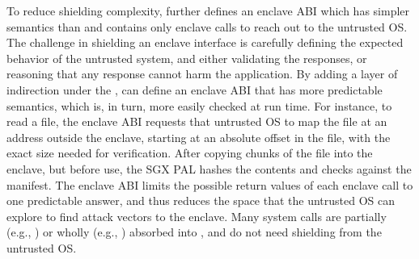 To reduce shielding complexity,
\graphenesgx{} further defines an enclave ABI which has simpler semantics than \thehostabi{}
and contains only \enclavecallnum{} enclave calls to reach out to the untrusted OS.
The challenge in shielding an enclave interface is carefully
defining the expected behavior of the untrusted system,
and either validating the responses, or reasoning that any response 
cannot harm the application.
By adding a layer of indirection under the \libos{}, \graphenesgx{} can define
an enclave ABI that has
more predictable semantics, which is, in turn, more easily checked at run time.
For instance, to read a file, the enclave ABI requests that untrusted OS to map the file at an address
outside the enclave,
starting at an absolute offset in the file, with the exact size needed for verification.
After copying chunks of the file into the enclave, but before use, 
the SGX PAL hashes the contents
and checks against the manifest.
The enclave ABI limits the possible return values of each enclave call to one predictable answer, and thus reduces the space that the untrusted OS can explore to find attack vectors to the enclave.
Many system calls are partially (e.g., ) or wholly (e.g., ) absorbed into \thelibos{}, and do not need shielding from the untrusted OS.

